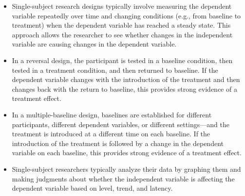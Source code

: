 \begin{fullwidth}
 
\begin{itemize}
 
 
\item Single-subject research designs typically involve measuring the dependent variable repeatedly over time and changing conditions (e.g., from baseline to treatment) when the dependent variable has reached a steady state. This approach allows the researcher to see whether changes in the independent variable are causing changes in the dependent variable.
 
 \item In a reversal design, the participant is tested in a baseline condition, then tested in a treatment condition, and then returned to baseline. If the dependent variable changes with the introduction of the treatment and then changes back with the return to baseline, this provides strong evidence of a treatment effect.
 
 \item In a multiple-baseline design, baselines are established for different participants, different dependent variables, or different settings---and the treatment is introduced at a different time on each baseline. If the introduction of the treatment is followed by a change in the dependent variable on each baseline, this provides strong evidence of a treatment effect.
 
 \item Single-subject researchers typically analyze their data by graphing them and making judgments about whether the independent variable is affecting the dependent variable based on level, trend, and latency.
 
 
\end{itemize}
 
\end{fullwidth}
 
 
 
\subsection{}
 
